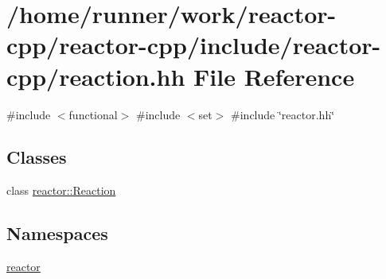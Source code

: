 \hypertarget{reaction_8hh}{}\section{/home/runner/work/reactor-\/cpp/reactor-\/cpp/include/reactor-\/cpp/reaction.hh File Reference}
\label{reaction_8hh}
{\ttfamily \#include $<$functional$>$}\newline
{\ttfamily \#include $<$set$>$}\newline
{\ttfamily \#include \char`\"{}reactor.\+hh\char`\"{}}\newline
\subsection*{Classes}
\begin{DoxyCompactItemize}
\item 
class \hyperlink{classreactor_1_1Reaction}{reactor\+::\+Reaction}
\end{DoxyCompactItemize}
\subsection*{Namespaces}
\begin{DoxyCompactItemize}
\item 
 \hyperlink{namespacereactor}{reactor}
\end{DoxyCompactItemize}
